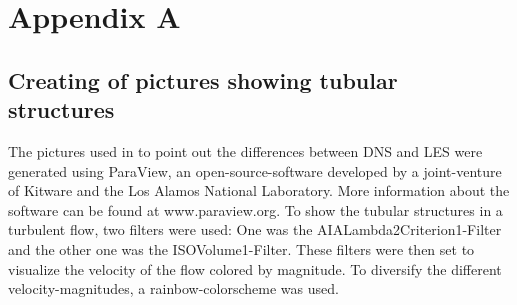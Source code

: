 \documentclass[11pt,a4paper,openany,oneside,parskip=half*]{article}
\begin{document}
\section{Appendix A}
\subsection*{Creating of pictures showing tubular structures}
The pictures used in to point out the differences between DNS and LES were generated using ParaView, an open-source-software developed by a joint-venture of Kitware and the Los Alamos National Laboratory. More information about the software can be found at www.paraview.org. To show the tubular structures in a turbulent flow, two filters were used: One was the AIALambda2Criterion1-Filter and the other one was the ISOVolume1-Filter. These filters were then set to visualize the velocity of the flow colored by magnitude. To diversify the different velocity-magnitudes, a rainbow-colorscheme was used. 
\end{document}

